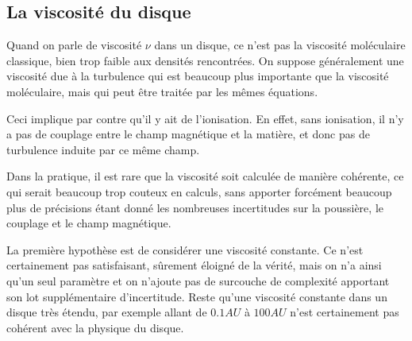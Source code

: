 \subsection{La viscosité du disque}\label{sec:viscosite}%
Quand on parle de viscosité $\nu$ dans un disque, ce n'est pas la viscosité moléculaire classique, bien trop faible aux densités rencontrées. On suppose généralement une viscosité due à la turbulence qui est beaucoup plus importante que la viscosité moléculaire, mais qui peut être traitée par les mêmes équations. 

Ceci implique par contre qu'il y ait de l'ionisation. En effet, sans ionisation, il n'y a pas de couplage entre le champ magnétique et la matière, et donc pas de turbulence induite par ce même champ. 

Dans la pratique, il est rare que la viscosité soit calculée de manière cohérente, ce qui serait beaucoup trop couteux en calculs, sans apporter forcément beaucoup plus de précisions étant donné les nombreuses incertitudes sur la poussière, le couplage et le champ magnétique. 

\bigskip

La première hypothèse est de considérer une viscosité constante. Ce n'est certainement pas satisfaisant, sûrement éloigné de la vérité, mais on n'a ainsi qu'un seul paramètre et on n'ajoute pas de surcouche de complexité apportant son lot supplémentaire d'incertitude. Reste qu'une viscosité constante dans un disque très étendu, par exemple allant de $0.1\unit{AU}$ à $100\unit{AU}$ n'est certainement pas cohérent avec la physique du disque. 

